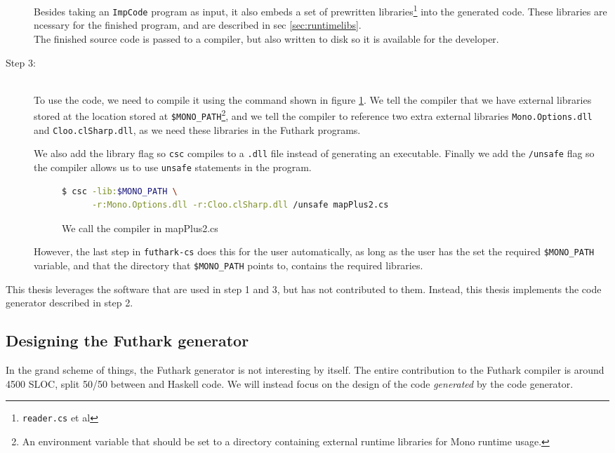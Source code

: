 \begin{description}
Besides taking an \texttt{ImpCode} program as input, it also embeds a set of
prewritten \csharp{} libraries\footnote{\texttt{reader.cs} et al} into the generated \csharp{} code. These
libraries are ncessary for the finished \csharp{} program, and are described in
sec \ref{sec:runtimelibs}.\\
The finished \csharp{} source code is passed to a \csharp{} compiler, but also
written to disk so it is available for the developer.

\item[Step 3:]\hfill\\
  To use the \csharp{} code, we need to compile it using the command shown in
  figure \ref{fig:callcsc}. We tell the compiler that we have external libraries
  stored at the location stored at \texttt{\$MONO\_PATH}\footnote{An environment
  variable that should be set to a directory containing external runtime
  libraries for Mono runtime usage.}, and we tell the compiler to
  reference two extra external libraries \texttt{Mono.Options.dll} and
  \texttt{Cloo.clSharp.dll}, as we need these libraries in the Futhark \csharp{} programs.

  We also add the library flag so \texttt{csc} compiles to a \texttt{.dll} file instead of
  generating an executable. Finally we add the \texttt{/unsafe} flag so the
  compiler allows us to use \texttt{unsafe} statements in the \csharp{} program.

\begin{figure}[H]
  \centering
  \begin{lstlisting}[language=sh]
$ csc -lib:$MONO_PATH \
      -r:Mono.Options.dll -r:Cloo.clSharp.dll /unsafe mapPlus2.cs
  \end{lstlisting}
  \caption{We call the \csharp{} compiler in mapPlus2.cs}
  \label{fig:callcsc}
\end{figure}

However, the last step in \texttt{futhark-cs} does this for the user
automatically, as long as the user has the set the required \texttt{\$MONO\_PATH}
variable, and that the directory that \texttt{\$MONO\_PATH} points to, contains the
required libraries.

\end{description}

This thesis leverages the software that are used in step 1 and 3, but has not
contributed to them. Instead, this thesis implements the code generator
described in step 2.

\subsection{Designing the Futhark \csharp{} generator}
In the grand scheme of things, the Futhark \csharp{} generator is not
interesting by itself. The entire contribution to the Futhark compiler is
around 4500 SLOC, split 50/50 between \csharp{} and Haskell code.
We will instead focus on the design of the code \textit{generated} by the code generator.

